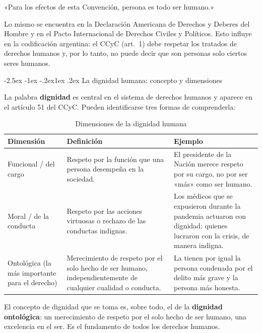 \documentclass[12pt,oneside]{book}
\makeatletter
\renewcommand\subsection{\@startsection{subsection}{2}{\z@}%
  {-2.5ex \@plus -1ex \@minus -.2ex}{1ex \@plus .2ex}%
  {\normalfont\normalsize\bfseries}}
\makeatother
\begin{document}
\begin{regla}
«Para los efectos de esta Convención, persona es todo ser humano.»
\end{regla}

Lo mismo se encuentra en la Declaración Americana de Derechos y Deberes del Hombre y en el Pacto Internacional de Derechos Civiles y Políticos. Esto influye en la codificación argentina: el CCyC (art.~1) debe respetar los tratados de derechos humanos y, por lo tanto, no puede decir que son personas solo ciertos seres humanos.

\subsection{La dignidad humana: concepto y dimensiones}

La palabra \textbf{dignidad} es central en el sistema de derechos humanos y aparece en el artículo 51 del CCyC. Pueden identificarse tres formas de comprenderla:

\begin{table}[H]
\centering
\begin{tabularx}{\textwidth}{B{0.19\textwidth} Y Y}
\toprule
\textbf{Dimensión} & \textbf{Definición} & \textbf{Ejemplo} \\
\midrule
Funcional / del cargo & Respeto por la función que una persona desempeña en la sociedad. & El presidente de la Nación merece respeto por su cargo, no por ser «más» como ser humano. \\
Moral / de la conducta & Respeto por las acciones virtuosas o rechazo de las conductas indignas. & Los médicos que se expusieron durante la pandemia actuaron con dignidad; quienes lucraron con la crisis, de manera indigna. \\
Ontológica (la más importante para el derecho) & Merecimiento de respeto por el solo hecho de ser humano, independientemente de cualquier cualidad o conducta. & La tienen por igual la persona condenada por el delito más grave y la persona más honesta. \\
\bottomrule
\end{tabularx}
\caption{Dimensiones de la dignidad humana}
\end{table}

\begin{importante}
El concepto de dignidad que se toma es, sobre todo, el de la \textbf{dignidad ontológica}: un merecimiento de respeto por el solo hecho de ser humano, una excelencia en el ser. Es el fundamento de todos los derechos humanos.
\end{importante}
\end{document}
